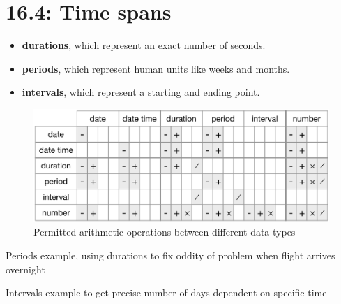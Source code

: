 \documentclass[]{book}
\newenvironment{Shaded}{\begin{snugshade}}{\end{snugshade}}
\newcommand{\DataTypeTok}[1]{\textcolor[rgb]{0.13,0.29,0.53}{#1}}
\newcommand{\DecValTok}[1]{\textcolor[rgb]{0.00,0.00,0.81}{#1}}
\newcommand{\KeywordTok}[1]{\textcolor[rgb]{0.13,0.29,0.53}{\textbf{#1}}}
\newcommand{\NormalTok}[1]{#1}
\newcommand{\OperatorTok}[1]{\textcolor[rgb]{0.81,0.36,0.00}{\textbf{#1}}}
\newcommand{\StringTok}[1]{\textcolor[rgb]{0.31,0.60,0.02}{#1}}
\providecommand{\tightlist}{%
  \setlength{\itemsep}{0pt}\setlength{\parskip}{0pt}}
\theoremstyle{definition}
\theoremstyle{definition}
\theoremstyle{definition}
\theoremstyle{remark}
\begin{document}
\hypertarget{time-spans}{%
\section{16.4: Time spans}\label{time-spans}}

\begin{itemize}
\tightlist
\item
  \textbf{durations}, which represent an exact number of seconds.
\item
  \textbf{periods}, which represent human units like weeks and months.
\item
  \textbf{intervals}, which represent a starting and ending point.
\end{itemize}

\begin{figure}
\centering
\includegraphics{datetimes-arithmetic.png}
\caption{Permitted arithmetic operations between different data types}
\end{figure}

Periods example, using durations to fix oddity of problem when flight
arrives overnight

\begin{Shaded}
\end{Shaded}

Intervals example to get precise number of days dependent on specific
time
\end{document}
